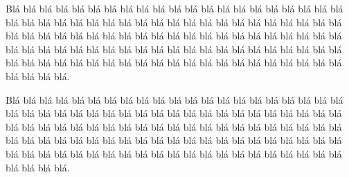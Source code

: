 \documentclass[
]{book}
\begin{document}
Blá blá blá blá blá blá blá blá blá blá blá blá blá blá blá blá blá blá blá blá blá blá blá blá blá blá blá blá blá blá blá blá blá blá blá blá blá blá blá blá blá blá blá blá blá blá blá blá blá blá blá blá blá blá blá blá blá blá blá blá blá blá blá blá blá blá blá blá blá blá blá blá blá blá blá blá blá blá blá blá blá blá blá blá blá blá blá blá blá blá blá blá blá blá blá blá blá blá blá blá blá blá blá blá blá blá blá blá blá.

Blá blá blá blá blá blá blá blá blá blá blá blá blá blá blá blá blá blá blá blá blá blá blá blá blá blá blá blá blá blá blá blá blá blá blá blá blá blá blá blá blá blá blá blá blá blá blá blá blá blá blá blá blá blá blá blá blá blá blá blá blá blá blá blá blá blá blá blá blá blá blá blá blá blá blá blá blá blá blá blá blá blá blá blá blá blá blá blá blá blá blá blá blá blá blá blá blá blá blá blá blá blá blá blá blá blá blá blá blá.

  
\end{document}
